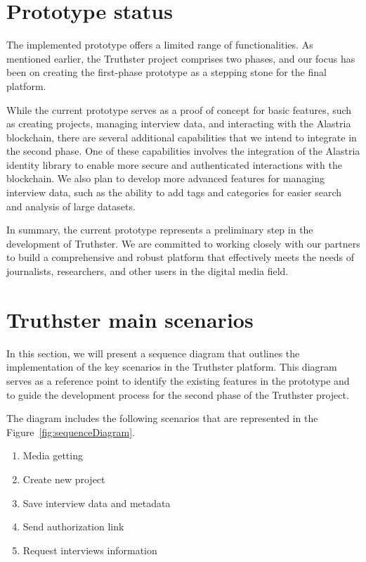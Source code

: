 \documentclass[target=mst,aauheader=]{thud}
\begin{document}
\section{Prototype status}

The implemented prototype offers a limited range of functionalities. As mentioned earlier, the Truthster project comprises two phases, and our focus has been on creating the first-phase prototype as a stepping stone for the final platform.\par
While the current prototype serves as a proof of concept for basic features, such as creating projects, managing interview data, and interacting with the Alastria blockchain, there are several additional capabilities that we intend to integrate in the second phase. One of these capabilities involves the integration of the Alastria identity library to enable more secure and authenticated interactions with the blockchain. We also plan to develop more advanced features for managing interview data, such as the ability to add tags and categories for easier search and analysis of large datasets.\par
In summary, the current prototype represents a preliminary step in the development of Truthster. We are committed to working closely with our partners to build a comprehensive and robust platform that effectively meets the needs of journalists, researchers, and other users in the digital media field.

\section{Truthster main scenarios}

In this section, we will present a sequence diagram that outlines the implementation of the key scenarios in the Truthster platform. This diagram serves as a reference point to identify the existing features in the prototype and to guide the development process for the second phase of the Truthster project.\par
The diagram includes the following scenarios that are represented in the Figure~\ref{fig:sequenceDiagram}.

\begin{enumerate}

    \item Media getting
    \item Create new project
    \item Save interview data and metadata
    \item Send authorization link
    \item Request interviews information

\end{enumerate}
\end{document}
